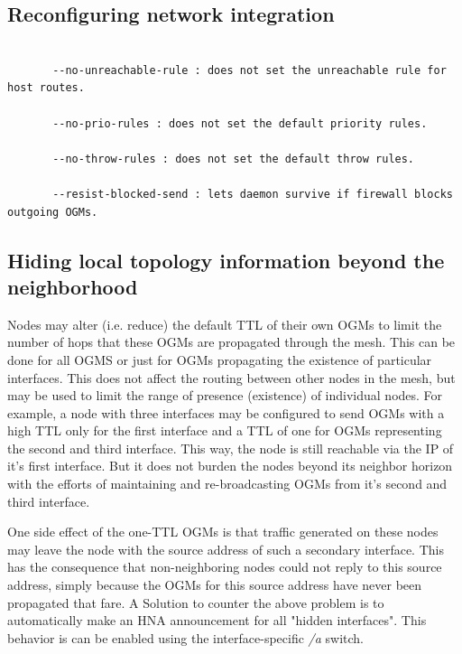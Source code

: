 \documentclass[11pt]{article}
\begin{document}
\subsection{Reconfiguring network integration}

\begin{small} \begin{verbatim}

       --no-unreachable-rule : does not set the unreachable rule for host routes.

       --no-prio-rules : does not set the default priority rules.

       --no-throw-rules : does not set the default throw rules.

       --resist-blocked-send : lets daemon survive if firewall blocks outgoing OGMs.

\end{verbatim} \end{small}

\subsection{Hiding local topology information beyond the neighborhood}
\label{sec:hiding-topology}
Nodes may alter (i.e. reduce) the default TTL of their own OGMs to limit the number of hops that these OGMs are propagated through the mesh. 
This can be done for all OGMS or just for OGMs propagating the existence of particular interfaces. 
This does not affect the routing between other nodes in the mesh, but may be used to limit the range of presence (existence) of individual nodes. 
For example, a node with three interfaces may be configured to send OGMs with a high TTL only for the first interface and a TTL of one for OGMs representing the second and third interface. 
%
This way, the node is still reachable via the IP of it's first interface. 
But it does not burden the nodes beyond its neighbor horizon with the efforts of maintaining and re-broadcasting OGMs from it's second and third interface.

One side effect of the one-TTL OGMs is that traffic generated on these nodes may leave the node with the source address
of such a secondary interface. 
%
This has the consequence that non-neighboring nodes could not reply to this source address, simply because the OGMs for this source address have never been propagated that fare.
A Solution to counter the above problem is to automatically make an HNA announcement for all "hidden interfaces". 
This behavior is can be enabled using the interface-specific \emph{/a} switch. 
\end{document}

